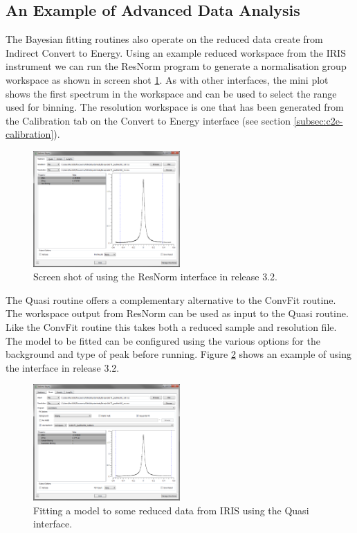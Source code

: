 \documentclass[paper=a4, fontsize=11pt]{scrartcl}	%
\numberwithin{equation}{section}															%
\numberwithin{figure}{section}																%
\numberwithin{table}{section}																%
\begin{document}
\subsection{An Example of Advanced Data Analysis}
The Bayesian fitting routines also operate on the reduced data create from Indirect Convert to Energy. Using an example reduced workspace from the IRIS instrument we can run the ResNorm program to generate a normalisation group workspace as shown in screen shot \ref{fig:iris-bayes-resnorm}. As with other interfaces, the mini plot shows the first spectrum in the workspace and can be used to select the range used for binning. The resolution workspace is one that has been generated from the Calibration tab on the Convert to Energy interface (see section \ref{subsec:c2e-calibration}).

\begin{figure}[H]
\centering
\includegraphics[width=0.5\textwidth]{img/iris-bayes-resnorm.png}
\caption{Screen shot of using the ResNorm interface in release 3.2.}
\label{fig:iris-bayes-resnorm}
\end{figure}

The Quasi routine offers a complementary alternative to the ConvFit routine. The workspace output from ResNorm can be used as input to the Quasi routine. Like the ConvFit routine this takes both a reduced sample and resolution file. The model to be fitted can be configured using the various options for the background and type of peak before running. Figure \ref{fig:iris-bayes-quasi} shows an example of using the interface in release 3.2.

\begin{figure}[H]
\centering
\includegraphics[width=0.5\textwidth]{img/iris-bayes-quasi.png}
\caption{Fitting a model to some reduced data from IRIS using the Quasi interface.}
\label{fig:iris-bayes-quasi}
\end{figure}
\end{document}
